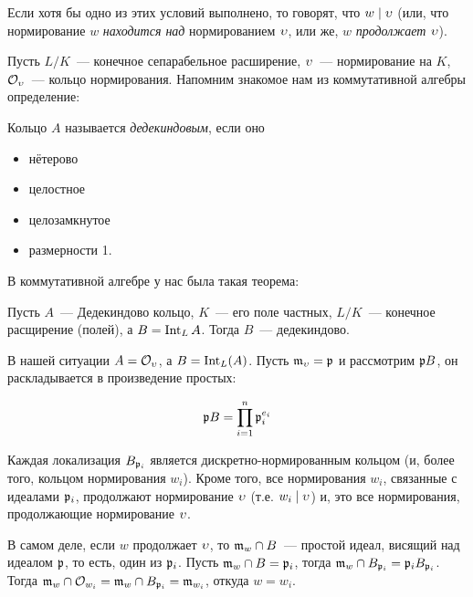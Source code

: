 	\begin{definition} 
		Если хотя бы одно из этих условий выполнено, то говорят, что $w \mid \upsilon$ (или, что нормирование $w$ \emph{находится над} нормированием $\upsilon$, или же, $w$ \emph{продолжает} $\upsilon$). 
	\end{definition}

	Пусть $L/K$~--- конечное сепарабельное расширение, $\upsilon$~--- нормирование на $K$, $\mathcal{O}_{\upsilon}$~--- кольцо нормирования. Напомним знакомое нам из коммутативной алгебры определение:

	\begin{definition} 
		Кольцо $A$ называется \emph{дедекиндовым}, если оно 
		\begin{itemize}
			\item нётерово

			\item целостное

			\item целозамкнутое 

			\item размерности 1.
		\end{itemize}
	\end{definition}

	В коммутативной алгебре у нас была такая теорема:

	\begin{theorem} 
		Пусть $A$~--- Дедекиндово кольцо, $K$~--- его поле частных, $L/K$~--- конечное расщирение (полей), а $B = \operatorname{Int}_{L}{A}$. Тогда $B$~--- дедекиндово. 
	\end{theorem}

	В нашей ситуации $A = \mathcal{O}_{\upsilon}$, а $B = \operatorname{Int}_{L}(A)$. Пусть  $\mathfrak{m}_{\upsilon} = \mathfrak{p}$ и рассмотрим $\mathfrak{p} B$, он раскладывается в произведение простых: 

	\[
		\mathfrak{p} B = \prod_{i = 1}^{n} \mathfrak{p}_{i}^{e_i} 
	\]

	Каждая локализация $B_{\mathfrak{p}_i}$ является дискретно-нормированным кольцом (и, более того, кольцом нормирования $w_i$). Кроме того, все нормирования $w_i$, связанные с идеалами $\mathfrak{p}_i$, продолжают нормирование $\upsilon$ (т.е. $w_i \mid \upsilon$) и, это все нормирования, продолжающие нормирование $\upsilon$.

	В самом деле, если $w$ продолжает $\upsilon$, то $\mathfrak{m}_{w} \cap B$~--- простой идеал, висящий над идеалом $\mathfrak{p}$, то есть, один из $\mathfrak{p}_i$. Пусть $\mathfrak{m}_{w} \cap B = \mathfrak{p}_i$, тогда $\mathfrak{m}_{w} \cap B_{\mathfrak{p}_i} = \mathfrak{p}_i B_{\mathfrak{p}_i}$. Тогда $\mathfrak{m}_{w} \cap \mathcal{O}_{w_i} = \mathfrak{m}_{w} \cap B_{\mathfrak{p}_i} = \mathfrak{m}_{w_i}$, откуда $w = w_i$.

